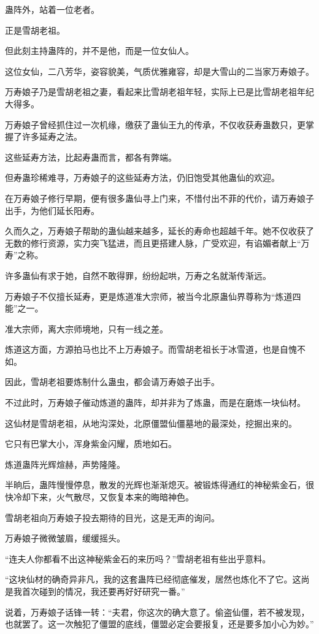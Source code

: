 \begin{this_body}
蛊阵外，站着一位老者。

正是雪胡老祖。

但此刻主持蛊阵的，并不是他，而是一位女仙人。

这位女仙，二八芳华，姿容貌美，气质优雅雍容，却是大雪山的二当家万寿娘子。

万寿娘子乃是雪胡老祖之妻，看起来比雪胡老祖年轻，实际上已是比雪胡老祖年纪大得多。

万寿娘子曾经抓住过一次机缘，缴获了蛊仙王九的传承，不仅收获寿蛊数只，更掌握了许多延寿之法。

这些延寿方法，比起寿蛊而言，都各有弊端。

但寿蛊珍稀难寻，万寿娘子的这些延寿方法，仍旧饱受其他蛊仙的欢迎。

在万寿娘子修行早期，便有很多蛊仙寻上门来，不惜付出不菲的代价，请万寿娘子出手，为他们延长阳寿。

久而久之，万寿娘子帮助的蛊仙越来越多，延长的寿命也超越千年。她不仅收获了无数的修行资源，实力突飞猛进，而且更搭建人脉，广受欢迎，有谄媚者献上“万寿”之称。

许多蛊仙有求于她，自然不敢得罪，纷纷起哄，万寿之名就渐传渐远。

万寿娘子不仅擅长延寿，更是炼道准大宗师，被当今北原蛊仙界尊称为“炼道四能”之一。

准大宗师，离大宗师境地，只有一线之差。

炼道这方面，方源拍马也比不上万寿娘子。而雪胡老祖长于冰雪道，也是自愧不如。

因此，雪胡老祖要炼制什么蛊虫，都会请万寿娘子出手。

不过此时，万寿娘子催动炼道的蛊阵，却并非为了炼蛊，而是在磨炼一块仙材。

这仙材是雪胡老祖，从地沟深处，北原僵盟仙僵墓地的最深处，挖掘出来的。

它只有巴掌大小，浑身紫金闪耀，质地如石。

炼道蛊阵光辉煊赫，声势隆隆。

半晌后，蛊阵慢慢停息，散发的光辉也渐渐熄灭。被锻炼得通红的神秘紫金石，很快冷却下来，火气散尽，又恢复本来的晦暗神色。

雪胡老祖向万寿娘子投去期待的目光，这是无声的询问。

万寿娘子微微皱眉，缓缓摇头。

“连夫人你都看不出这神秘紫金石的来历吗？”雪胡老祖有些出乎意料。

“这块仙材的确奇异非凡，我的这套蛊阵已经彻底催发，居然也炼化不了它。这尚是我首次碰到的情况，我还要再好好研究一番。”

说着，万寿娘子话锋一转：“夫君，你这次的确大意了。偷盗仙僵，若不被发现，也就罢了。这一次触犯了僵盟的底线，僵盟必定会要报复，还是要多加小心为妙。”


\end{this_body}
